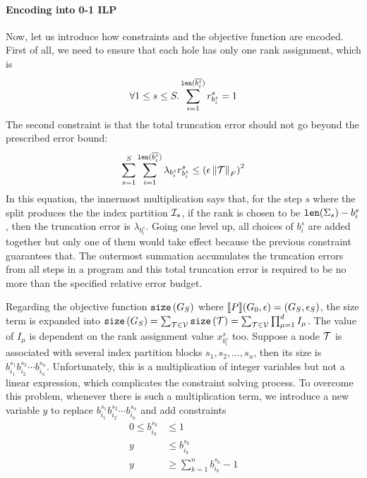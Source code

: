 \paragraph{Encoding into 0-1 ILP}
%
Now, let us introduce how constraints and the objective function are encoded.
%
First of all, we need to ensure that each hole has only one rank assignment, which is
\begin{equation}
    \forall 1 \leq s \leq S. \sum_{i=1}^{\mathtt{len}(\overline{b^s_i})} r^s_{b^s_i} = 1
\end{equation}
The second constraint is that the total truncation error should not go beyond the prescribed error bound:
\begin{equation}
    \sum_{s=1}^{S} \sum_{i=1}^{\mathtt{len}(\overline{b^s_i})} \lambda_{b^s_i}r^s_{b^s_i} \leq \left(\epsilon \left\lVert\mathcal{T}\right\rVert_{F}\right)^2
\end{equation}
%
In this equation, the innermost multiplication says that, for the step $s$ where the split produces the the index partition $\mathcal{I}_s$, if the rank is chosen to be $\mathtt{len}(\Sigma_s) - b^s_i$, then the truncation error is $\lambda_{b^s_i}$.
%
Going one level up, all choices of $b_i^s$ are added together but only one of them would take effect because the previous constraint guarantees that.
%
The outermost summation accumulates the truncation errors from all steps in a program and this total truncation error is required to be no more than the specified relative error budget.

Regarding the objective function $\mathtt{size}\left(G_S\right)$ where $\llbracket P \rrbracket(G_0, \epsilon) = (G_S, \epsilon_S)$,
the size term is expanded into $\mathtt{size}\left(G_S\right) = \sum_{\mathcal{T} \in \mathcal{V}}\mathtt{size}\left(\mathcal{T}\right) = \sum_{\mathcal{T} \in \mathcal{V}}\prod_{\mu=1}^{d} I_\mu$.
%
The value of $I_\mu$ is dependent on the rank assignment value $x^s_{b^s_i}$ too.
%
Suppose a node $\mathcal{T}$ is associated with several index partition blocks $s_1, s_2, \ldots, s_n$, then its size is $b^{s_1}_{i_1} b^{s_2}_{i_2} \cdots b^{s_n}_{i_n}$.
%
Unfortunately, this is a multiplication of integer variables but not a linear expression, which complicates the constraint solving process.
%
To overcome this problem, whenever there is such a multiplication term, we introduce a new variable $y$ to replace $b^{s_1}_{i_1} b^{s_2}_{i_2} \cdots b^{s_n}_{i_n}$ and add constraints
\begin{equation}
    \begin{aligned}
        0 \leq b^{s_k}_{i_k} &\leq 1 \\
        y & \leq b^{s_k}_{i_k} \\
        y & \geq \sum_{k=1}^{n} b^{s_k}_{i_k} - 1 \\
    \end{aligned}
\end{equation}

